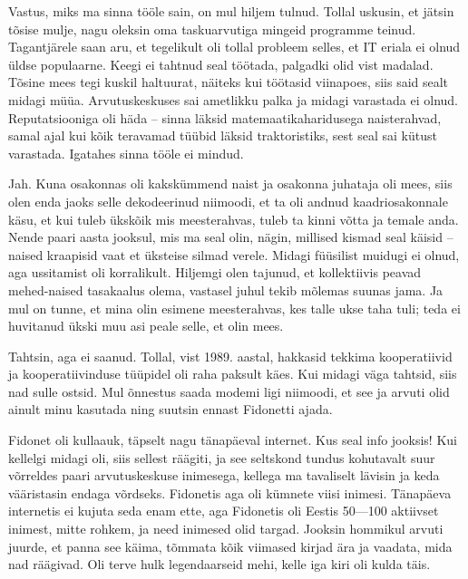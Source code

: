 Vastus, miks ma sinna tööle sain, on mul hiljem 
tulnud. Tollal uskusin, et jätsin tõsise mulje, nagu oleksin oma 
taskuarvutiga mingeid programme teinud. Tagantjärele saan aru, et tegelikult oli tollal probleem selles, et IT eriala ei olnud üldse 
populaarne. Keegi ei tahtnud seal töötada, palgadki olid vist madalad. Tõsine 
mees tegi kuskil haltuurat, näiteks kui töötasid viinapoes, siis said 
sealt midagi müüa. Arvutuskeskuses sai ametlikku 
palka ja midagi varastada ei olnud. Reputatsiooniga oli häda -- sinna läksid 
matemaatikaharidusega naisterahvad, samal ajal kui kõik teravamad 
tüübid läksid traktoristiks, sest seal sai kütust varastada. 
Igatahes sinna tööle ei mindud. 


Jah. Kuna osakonnas oli kakskümmend naist ja osakonna 
juhataja oli mees, siis olen enda jaoks selle dekodeerinud niimoodi, 
et ta oli andnud kaadriosakonnale käsu, et kui tuleb ükskõik mis meesterahvas, 
tuleb ta kinni võtta ja temale anda. Nende paari aasta jooksul, mis 
ma seal olin, nägin, millised kismad seal käisid -- naised kraapisid vaat et
üksteise silmad verele. Midagi füüsilist muidugi ei olnud, aga ussitamist oli 
korralikult. Hiljemgi olen tajunud, et kollektiivis peavad 
mehed-naised tasakaalus olema, vastasel juhul tekib mõlemas suunas
jama. Ja mul on tunne, et mina olin esimene meesterahvas, kes talle ukse taha 
tuli; teda ei huvitanud ükski muu asi peale selle, et olin mees. 


Tahtsin, aga ei saanud. Tollal, vist 1989. aastal, hakkasid tekkima
kooperatiivid ja kooperatiivinduse tüüpidel oli raha 
paksult käes. Kui midagi väga tahtsid, siis nad sulle ostsid. Mul 
õnnestus saada modemi ligi niimoodi, et see ja arvuti olid ainult minu kasutada ning suutsin ennast Fidonetti ajada.

Fidonet oli 
kullaauk, täpselt nagu tänapäeval internet. Kus seal info jooksis! 
Kui kellelgi midagi oli, siis sellest räägiti, ja see seltskond tundus 
kohutavalt suur võrreldes paari arvutuskeskuse inimesega, kellega ma 
tavaliselt lävisin ja keda vääristasin endaga võrdseks. Fidonetis aga oli 
kümnete viisi inimesi. Tänapäeva internetis ei kujuta seda enam ette, aga Fidonetis oli Eestis 
50---100 aktiivset inimest, mitte rohkem, ja need inimesed 
olid targad. Jooksin hommikul arvuti juurde, et panna see käima, tõmmata 
kõik viimased kirjad ära ja vaadata, mida nad räägivad. Oli terve hulk 
legendaarseid mehi, kelle iga kiri oli kulda täis.


